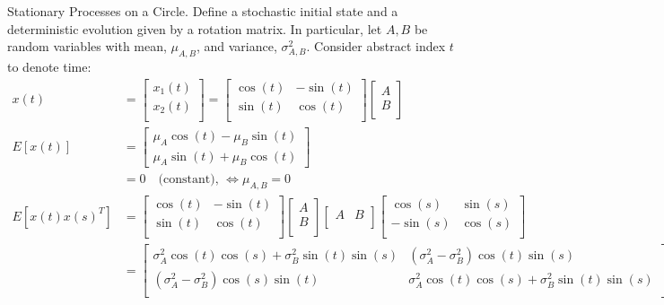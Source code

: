 \begin{defn} \label{sec:ap_ssp_circle} Stationary Processes on a Circle. Define a stochastic initial state and a deterministic evolution given by a rotation matrix. In particular, let  $A, B$ be random variables with mean, $\mu_{A,B}$, and variance, $\sigma_{A,B}^2$. Consider abstract index $t$ to denote time:
\begin{align}
x(t) &= \begin{bmatrix} x_1(t) \\ x_2(t) \\ \end{bmatrix} = \begin{bmatrix} \cos(t) & -\sin(t) \\ \sin(t) & \cos(t) \\ \end{bmatrix} \begin{bmatrix} A \\ B \\ \end{bmatrix} \\
E[x(t)]&= \begin{bmatrix} \mu_A \cos(t) - \mu_B \sin(t)\\ \mu_A \sin(t) + \mu_B \cos(t)\end{bmatrix}  \\
& = 0 \quad \text{(constant), $\iff \mu_{A,B} =0$} \\ 
E[x(t)x(s)^T]&= \begin{bmatrix} \cos(t) & -\sin(t) \\ \sin(t) & \cos(t) \\ \end{bmatrix} \begin{bmatrix} A \\ B \\ \end{bmatrix} \begin{bmatrix} A & B \\ \end{bmatrix} \begin{bmatrix} \cos(s) & \sin(s) \\ -\sin(s) & \cos(s) \\ %
\end{bmatrix} \\ 
&=\begin{bmatrix} 
\sigma_A^2\cos(t)\cos(s) + \sigma_B^2\sin(t)\sin(s) & (\sigma_A^2 - \sigma_B^2)\cos(t)\sin(s) \\ 
(\sigma_A^2 - \sigma_B^2)\cos(s)\sin(t) & \sigma_A^2 \cos(t)\cos(s) + \sigma_B^2\sin(t)\sin(s) \\ 

\end{bmatrix}
\end{align}
\end{defn}
